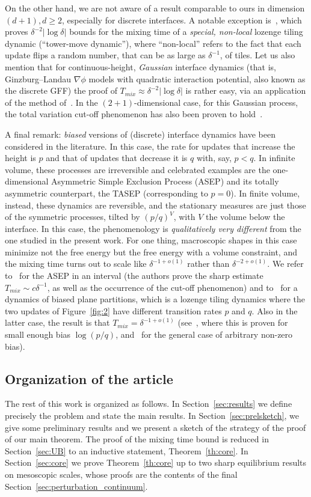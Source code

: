 \documentclass[AHL,Unicode,longabstracts,published]{cedram}
\begin{document}
On the other hand, we are not aware of a result comparable to ours in dimension $(d+1),d\ge2$, especially for discrete interfaces. A notable exception is~\cite{Wilson}, which proves $\delta^{-2}|\log \delta|$ bounds for the mixing time of a \emph{special, non-local} lozenge tiling dynamic (``tower-move dynamic''), where ``non-local'' refers to the fact that each update flips a random number, that can be as large as $\delta^{-1}$, of tiles. Let us also mention that for continuous-height, \emph{Gaussian} interface dynamics (that is, Ginzburg--Landau $\nabla \phi$ models with quadratic interaction potential, also known as the discrete GFF) the proof of $T_{mix}\approx \delta^{-2}|\log \delta|$ is rather easy, via an application of the method of~\cite{Wilson}. In the $(2+1)$-dimensional case, for this Gaussian process, the total variation cut-off phenomenon has also been proven to hold~\cite{GG}.

A final remark: \emph{biased} versions of (discrete) interface dynamics have been considered in the literature. In this case, the rate for updates that increase the height is $p$ and that of updates that decrease it is $q$ with, say, $p<q$. In infinite volume, these processes are irreversible and celebrated examples are the one-dimensional Asymmetric Simple Exclusion Process (ASEP) and its totally asymmetric counterpart, the TASEP (corresponding to $p=0$). In finite volume, instead, these dynamics are reversible, and the stationary measures are just those of the symmetric processes, tilted by $(p/q)^V$, with $V$ the volume below the interface. In this case, the phenomenology is \emph{qualitatively very different} from the one studied in the present work. For one thing, macroscopic shapes in this case minimize not the free energy but the free energy with a volume constraint, and the mixing time turns out to scale like $\delta^{-1+o(1)}$ rather than $\delta^{-2+o(1)}$. We refer to~\cite{LLabbe} for the ASEP in an interval (the authors prove the sharp estimate $T_{mix}\sim c \delta^{-1}$, as well as the occurrence of the cut-off phenomenon) and to~\cite{CMTRSA,GP} for a dynamics of biased plane partitions, which is a lozenge tiling dynamics where the two updates of Figure~\ref{fig:2} have different transition rates $p$ and $q$. Also in the latter case, the result is that $T_{mix}=\delta^{-1+o(1)}$ (see~\cite{GP}, where this is proven for small enough bias $\log(p/q)$, and~\cite{CMTRSA} for the general case of arbitrary non-zero bias).


\subsection*{Organization of the article}
The rest of this work is organized as follows. In Section~\ref{sec:results} we define precisely the problem and state the main results. In Section~\ref{sec:prelsketch}, we give some preliminary results and we present a sketch of the strategy of the proof of our main theorem. The proof of the mixing time bound is reduced in Section~\ref{sec:UB} to an inductive statement, Theorem~\ref{th:core}. In Section~\ref{sec:core} we prove Theorem~\ref{th:core} up to two sharp equilibrium results on mesoscopic scales, whose proofs are the contents of the final Section~\ref{sec:perturbation_continuum}.
\end{document}
